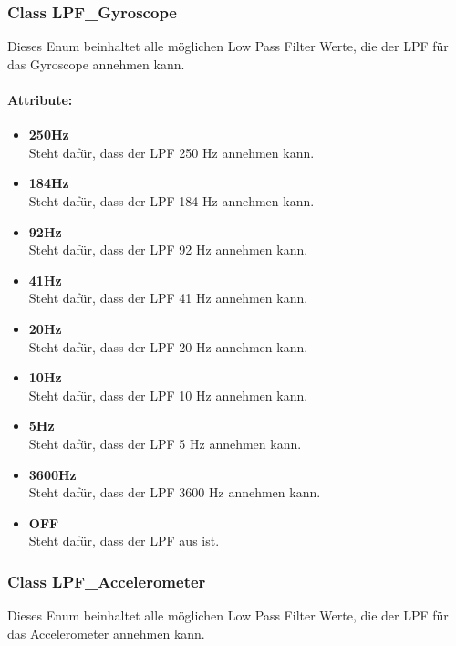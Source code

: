 \documentclass[a4paper,12pt]{article}
\begin{document}
\subsubsection{Class LPF\_Gyroscope}
Dieses Enum beinhaltet alle möglichen Low Pass Filter Werte, die der LPF für das Gyroscope annehmen kann.

\paragraph{Attribute:}
\begin{itemize}
	\item \textbf{250Hz}\\Steht dafür, dass der LPF 250 Hz annehmen kann.
	\item \textbf{184Hz}\\Steht dafür, dass der LPF 184 Hz annehmen kann.
	\item \textbf{92Hz}\\Steht dafür, dass der LPF 92 Hz annehmen kann.
	\item \textbf{41Hz}\\Steht dafür, dass der LPF 41 Hz annehmen kann.
	\item \textbf{20Hz}\\Steht dafür, dass der LPF 20 Hz annehmen kann.
	\item \textbf{10Hz}\\Steht dafür, dass der LPF 10 Hz annehmen kann.
	\item \textbf{5Hz}\\Steht dafür, dass der LPF 5 Hz annehmen kann.
	\item \textbf{3600Hz}\\Steht dafür, dass der LPF 3600 Hz annehmen kann.
	\item \textbf{OFF}\\Steht dafür, dass der LPF aus ist.
\end{itemize}


\subsubsection{Class LPF\_Accelerometer}
Dieses Enum beinhaltet alle möglichen Low Pass Filter Werte, die der LPF für das Accelerometer annehmen kann.
\end{document}
